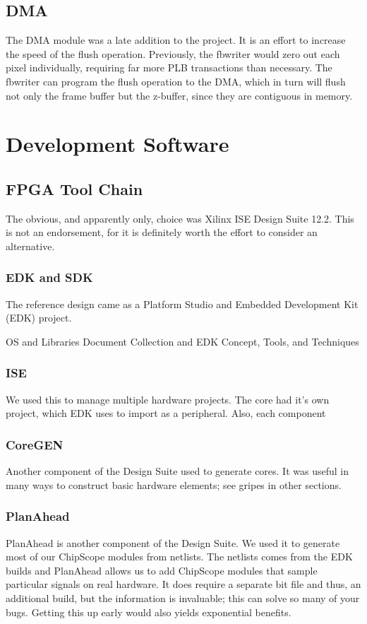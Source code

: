 \documentclass[letterpaper,10pt]{article}
\begin{document}
\subsection{DMA}
The DMA module was a late addition to the project.  It is an effort to increase the speed of the flush operation.  Previously, the fbwriter would zero out each pixel individually, requiring far more PLB transactions than necessary.  The fbwriter can program the flush operation to the DMA, which in turn will flush not only the frame buffer but the z-buffer, since they are contiguous in memory.

\section{Development Software}

\subsection{FPGA Tool Chain}
The obvious, and apparently only, choice was Xilinx ISE Design Suite 12.2.  This is not an endorsement, for it is definitely worth the effort to consider an alternative.

\subsubsection{EDK and SDK}
The reference design came as a Platform Studio and Embedded Development Kit (EDK) project.  

OS and Libraries Document Collection and EDK Concept, Tools, and Techniques

\subsubsection{ISE}
We used this to manage multiple hardware projects.  The core had it's own project, which EDK uses to import as a peripheral.  Also, each component 

\subsubsection{CoreGEN}
Another component of the Design Suite used to generate cores.  It was useful in many ways to construct basic hardware elements; see gripes in other sections.

\subsubsection{PlanAhead}
PlanAhead is another component of the Design Suite.  We used it to generate most of our ChipScope modules from netlists.  The netlists comes from the EDK builds and PlanAhead allows us to add ChipScope modules that sample particular signals on real hardware.  It does require a separate bit file and thus, an additional build, but the information is invaluable; this can solve so many of your bugs.  Getting this up early would also yields exponential benefits.
\end{document}
